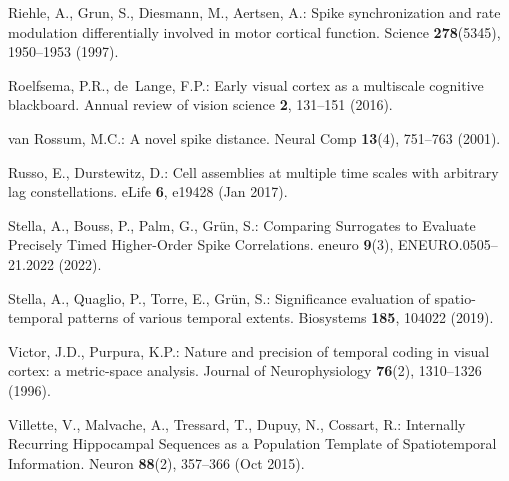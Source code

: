 \documentclass[runningheads]{llncs}
\begin{document}
{\begin{thebibliography}{10}
Riehle, A., Grun, S., Diesmann, M., Aertsen, A.: Spike synchronization and rate
  modulation differentially involved in motor cortical function. Science  \textbf{278}(5345),  1950--1953 (1997).
  
Roelfsema, P.R., de~Lange, F.P.: Early visual cortex as a multiscale cognitive
  blackboard. Annual review of vision science  \textbf{2},  131--151 (2016).

van Rossum, M.C.: A novel spike distance. Neural Comp  \textbf{13}(4),
  751--763 (2001). %

Russo, E., Durstewitz, D.: Cell assemblies at multiple time scales with
  arbitrary lag constellations. eLife  \textbf{6},  e19428 (Jan 2017).

Stella, A., Bouss, P., Palm, G., Grün, S.: Comparing {Surrogates} to
  {Evaluate} {Precisely} {Timed} {Higher}-{Order} {Spike} {Correlations}.
  eneuro  \textbf{9}(3),  ENEURO.0505--21.2022 (2022).

Stella, A., Quaglio, P., Torre, E., Grün, S.: {Significance}
  evaluation of spatio-temporal patterns of various temporal extents.
  Biosystems  \textbf{185},  104022 (2019).

Victor, J.D., Purpura, K.P.: Nature and precision of temporal coding in visual
  cortex: a metric-space analysis. Journal of Neurophysiology  \textbf{76}(2),
  1310--1326 (1996). %

Villette, V., Malvache, A., Tressard, T., Dupuy, N., Cossart, R.: Internally
  {Recurring} {Hippocampal} {Sequences} as a {Population} {Template} of
  {Spatiotemporal} {Information}. Neuron  \textbf{88}(2),  357--366 (Oct 2015).
  

\end{thebibliography}}
\end{document}
